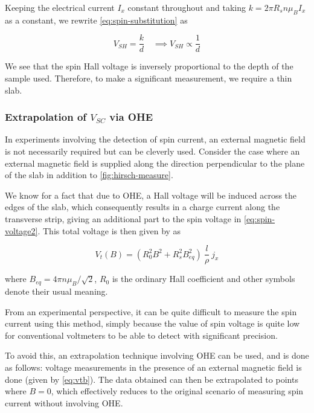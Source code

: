 Keeping the electrical current \( I_x \) constant throughout and taking \( k = 2 \pi R_s n \mu_B I_x \) as a constant, we rewrite \cref{eq:spin-substitution} as

\begin{equation} \label{eq:thin-slab}
    V_{SH} = \frac{k}{d} \quad \implies \boxed{V_{SH} \propto \frac{1}{d}}
\end{equation}

We see that the spin Hall voltage is inversely proportional to the depth of the sample used.
Therefore, to make a significant measurement, we require a thin slab.

\subsubsection{Extrapolation of \( V_{SC} \) via OHE}

\label{subsubsec:extrapolation}

In experiments involving the detection of spin current, an external magnetic field is not necessarily required but can be cleverly used.
Consider the case where an external magnetic field is supplied along the direction perpendicular to the plane of the slab in addition to \cref{fig:hirsch-measure}.

We know for a fact that due to OHE, a Hall voltage will be induced across the edges of the slab, which consequently results in a charge current along the transverse strip, giving an additional part to the spin voltage in \cref{eq:spin-voltage2}.
This total voltage is then given by \cite{hirsch1999spin} as

\begin{equation} \label{eq:vtb}
    V_t (B) = (R_0^2 B^2 + R_s^2 B_{eq}^2) \: \frac{l}{\rho} \: j_x
\end{equation}

where \( B_{eq} = 4 \pi n \mu_B / \sqrt{2} \), \( R_0 \) is the ordinary Hall coefficient and other symbols denote their usual meaning.

From an experimental perspective, it can be quite difficult to measure the spin current using this method, simply because the value of spin voltage is quite low for conventional voltmeters to be able to detect with significant precision.

To avoid this, an extrapolation technique involving OHE can be used, and is done as follows:
voltage measurements in the presence of an external magnetic field is done (given by \cref{eq:vtb}).
The data obtained can then be extrapolated to points where \( B = 0 \), which effectively reduces to the original scenario of measuring spin current without involving OHE.


